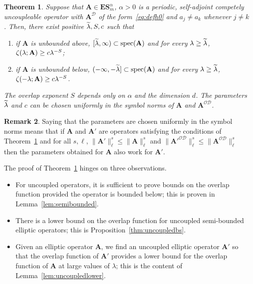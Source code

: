 \documentclass[10pt]{amsart}
\newtheorem{theo}{Theorem}[section]
\theoremstyle{definition}\newtheorem{defi}[theo]{Definition}\newtheorem{rema}[theo]{Remark}\newtheorem{exam}[theo]{Example}\newtheorem{nota}[theo]{Notation}
\DeclareMathOperator{\spec}{spec}
\newcommand{\CD}{\mathcal{D}}
\newcommand{\CO}{\mathcal{O}}
\newcommand{\BA}{\mathbf A}
\newcommand{\BE}{\mathbf E}
\newcommand{\BS}{\mathbf S}
\newcommand{\mpu}{competely uncoupleable}
\let\oldtilde\tilde
\renewcommand*{\tilde}[1]{\mathchoice{\widetilde{#1}}{\widetilde{#1}}{\oldtilde{#1}}{\oldtilde{#1}}}
\begin{document}
\begin{theo} \label{thm:bs}
Suppose that $\BA \in \BE\BS^\alpha_m$, $\alpha > 0$ is a periodic, self-adjoint
\mpu{} operator with $\BA^\CD$ of the form~\eqref{eq:defh0} and $a_j \ne a_k$ whenever $j \ne k$. Then, there exist positive $\tilde \lambda, S,c$ such that
\begin{enumerate}
\item \label{it:bspos}
if $\BA$ is unbounded above, $[\tilde \lambda,\infty) \subset
\spec(\BA)$ and for every $\lambda \ge \tilde \lambda$, $\zeta(\lambda;\BA)\linebreak \ge c
\lambda^{-S}$;
\item \label{it:bsneg}
if $\BA$ is unbounded below, $(- \infty,-\tilde \lambda] \subset
\spec(\BA)$ and for every $\lambda \ge \tilde \lambda$, $\zeta(-\lambda;\BA) \linebreak\ge c
\lambda^{-S}$.
\end{enumerate}
The overlap exponent $S$ depends only on $\alpha$ and the dimension $d$. The parameters $\tilde \lambda$ and $c$ can be chosen uniformly in the symbol norms of $\BA$ and $\BA^{\CO\CD}$.
\end{theo}


\begin{rema}
Saying that the parameters are chosen uniformly in the symbol norms means that if $\BA$ and $\BA'$ are operators satisfying the conditions of Theorem~\ref{thm:bs} and for all $s,\ell$, $\|\BA'\|^{s}_{\ell} \le \|\BA\|^{s}_{\ell}$ and $\|\BA'^{\CO\CD}\|^{s}_{\ell} \le \|\BA^{\CO\CD}\|^{s}_{\ell}$ then the parameters obtained for $\BA$ also work for $\BA'$.
\end{rema}


The proof of Theorem~\ref{thm:bs} hinges on three observations.
\begin{itemize}
\item For uncoupled operators, it is sufficient to prove bounds on the overlap function provided the operator is bounded below; this is proven in Lemma~\ref{lem:semibounded}.
\item There is a lower bound on the overlap function for uncoupled semi-bounded elliptic operators; this is Proposition~\ref{thm:uncoupledbs}.
\item Given an elliptic operator $\BA$, we find an uncoupled elliptic operator $\BA'$ so that the overlap function of $\BA'$ provides a lower bound for the overlap function of $\BA$ at large values of $\lambda$; this is the content of Lemma~\ref{lem:uncoupledlower}.
\end{itemize}
\end{document}
